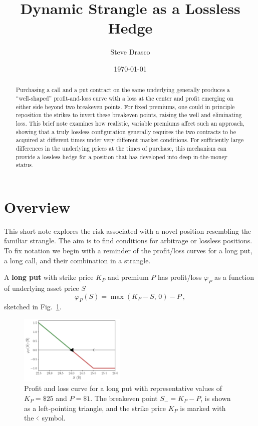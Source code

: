 \documentclass[aps,reprint]{revtex4-2}
\begin{document}
\title{Dynamic Strangle as a Lossless Hedge}
\author{Steve Drasco}
\date{\today}

\begin{abstract}
Purchasing a call and a put contract on the same underlying generally produces a “well-shaped” profit-and-loss curve with a loss at the center and profit emerging on either side beyond two breakeven points. For fixed premiums, one could in principle reposition the strikes to invert these breakeven points, raising the well and eliminating loss. This brief note examines how realistic, variable premiums affect such an approach, showing that a truly lossless configuration generally requires the two contracts to be acquired at different times under very different market conditions. For sufficiently large differences in the underlying prices at the times of purchase, this mechanism can provide a lossless hedge for a position that has developed into deep in-the-money status.
\end{abstract}

\maketitle

\section{Overview}

This short note explores the risk associated with a novel position resembling the familiar strangle.  The aim is to find conditions for arbitrage or lossless positions. To fix notation we begin with a reminder of the profit/loss curves for a long put, a long call, and their combination in a strangle. 

A \textbf{long put} with strike price $K_P$ and premium $P$ has profit/loss $\varphi_P$ as a function of underlying asset price $S$
\begin{equation}
\varphi_P(S) = \max(K_P - S,\,0) - P~,
\end{equation}
sketched in Fig.~\ref{fig:put}.
\begin{figure}[hb]
    \centering
    \includegraphics[width=0.45\textwidth]{figs/put.pdf}
    \caption{Profit and loss curve for a long put with representative values of $K_P = \$25$ and $P = \$1$.  The breakeven point $S_- = K_P - P$, is shown as a left-pointing triangle, and the strike price $K_P$ is marked with the $ \scalebox{0.5}[1]{$<$} $ symbol.}
    \label{fig:put}
\end{figure}
\end{document}
